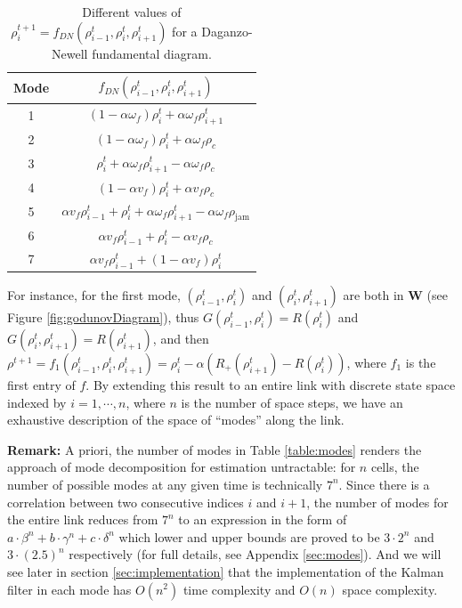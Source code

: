 \begin{table}[here]
\centering %
\begin{tabular}{c c} %
\hline\hline %
Mode & $f_{DN}(\rho^{t}_{i-1},\rho^{t}_{i},\rho^{t}_{i+1})$ \\ [0.5ex]%
\hline %
1 & $(1 - \alpha \omega_{f})\rho^{t}_{i} + \alpha \omega_{f} \rho^{t}_{i+1}$ \\ [1ex]
2 & $(1 - \alpha \omega_{f})\rho^{t}_{i} + \alpha \omega_{f} \rho_{c}$ \\ [1ex]
3 & $\rho^{t}_{i} + \alpha \omega_{f}\rho^{t}_{i+1} - \alpha \omega_{f}\rho_{c}$ \\ [1ex]
4 & $(1 - \alpha v_{f})\rho^{t}_{i} + \alpha v_{f} \rho_{c}$ \\ [1ex]
5 & $\alpha v_{f} \rho^{t}_{i-1} + \rho^{t}_{i} + \alpha \omega_{f} \rho^{t}_{i+1} - \alpha \omega_{f} \rho_{\text{jam}}$ \\ [1ex]
6 & $\alpha v_{f} \rho^{t}_{i-1} + \rho^{t}_{i} - \alpha v_{f} \rho_{c}$ \\ [1ex]
7 & $\alpha v_{f} \rho^{t}_{i-1} + (1 - \alpha v_{f})\rho^{t}_{i}$ \\ [1ex]%
\hline %
\end{tabular}
\label{table:modesDN} %
\caption{Different values of $\rho^{t+1}_{i} = f_{DN}(\rho^{t}_{i-1},\rho^{t}_{i},\rho^{t}_{i+1})$ for a Daganzo-Newell fundamental diagram.}
\end{table}

For instance, for the first mode, $(\rho^{t}_{i-1}, \rho^{t}_{i})$ and $(\rho^{t}_{i}, \rho^{t}_{i+1})$ are both in \textbf{W} (see Figure \ref{fig:godunovDiagram}), thus $G(\rho^{t}_{i-1}, \rho^{t}_{i}) = R(\rho^{t}_{i})$ and $G(\rho^{t}_{i}, \rho^{t}_{i+1}) = R(\rho^{t}_{i+1})$, and then $\rho^{t+1} = f_{1}(\rho^{t}_{i-1},\rho^{t}_{i},\rho^{t}_{i+1}) = \rho^{t}_{i} - \alpha(R_{+}(\rho^{t}_{i+1})-R(\rho^{t}_{i}))$, where $f_{1}$ is the first entry of $f$. By extending this result to an entire link with discrete state space indexed by $i = 1,\cdots,n$, where $n$ is the number of space steps, we have an exhaustive description of the space of ``modes'' along the link. 

\hspace{10mm}

\noindent \textbf{Remark:} A priori, the number of modes in Table \ref{table:modes} renders the approach of mode decomposition for estimation untractable: for $n$ cells, the number of possible modes at any given time is technically $7^{n}$. Since there is a correlation between two consecutive indices $i$ and $i+1$, the number of modes for the entire link reduces from $7^{n}$ to an expression in the form of $a\cdot\beta^{n} + b\cdot\gamma^{n} + c\cdot\delta^{n}$ which lower and upper bounds are proved to be $3\cdot 2^{n}$ and $3\cdot (2.5)^{n}$ respectively (for full details, see Appendix \ref{sec:modes}). And we will see later in section \ref{sec:implementation} that the implementation of the Kalman filter in each mode has $O(n^{2})$ time complexity and $O(n)$ space complexity.

